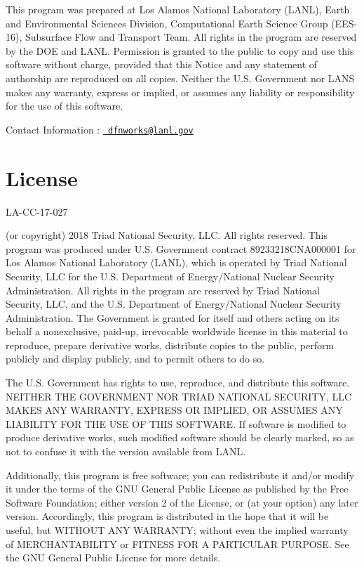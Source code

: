 This program was prepared at Los Alamos National Laboratory (L\+A\+NL), Earth and Environmental Sciences Division, Computational Earth Science Group (E\+E\+S-\/16), Subsurface Flow and Transport Team. All rights in the program are reserved by the D\+OE and L\+A\+NL. Permission is granted to the public to copy and use this software without charge, provided that this Notice and any statement of authorship are reproduced on all copies. Neither the U.\+S. Government nor L\+A\+NS makes any warranty, express or implied, or assumes any liability or responsibility for the use of this software.

Contact Information \+: \href{mailto:dfnworks@lanl.gov}{\texttt{ dfnworks@lanl.\+gov}}\hypertarget{index_license}{}\section{License}\label{index_license}
L\+A-\/\+C\+C-\/17-\/027

(or copyright) 2018 Triad National Security, L\+LC. All rights reserved. This program was produced under U.\+S. Government contract 89233218C\+N\+A000001 for Los Alamos National Laboratory (L\+A\+NL), which is operated by Triad National Security, L\+LC for the U.\+S. Department of Energy/\+National Nuclear Security Administration. All rights in the program are reserved by Triad National Security, L\+LC, and the U.\+S. Department of Energy/\+National Nuclear Security Administration. The Government is granted for itself and others acting on its behalf a nonexclusive, paid-\/up, irrevocable worldwide license in this material to reproduce, prepare derivative works, distribute copies to the public, perform publicly and display publicly, and to permit others to do so.

The U.\+S. Government has rights to use, reproduce, and distribute this software. N\+E\+I\+T\+H\+ER T\+HE G\+O\+V\+E\+R\+N\+M\+E\+NT N\+OR T\+R\+I\+AD N\+A\+T\+I\+O\+N\+AL S\+E\+C\+U\+R\+I\+TY, L\+LC M\+A\+K\+ES A\+NY W\+A\+R\+R\+A\+N\+TY, E\+X\+P\+R\+E\+SS OR I\+M\+P\+L\+I\+ED, OR A\+S\+S\+U\+M\+ES A\+NY L\+I\+A\+B\+I\+L\+I\+TY F\+OR T\+HE U\+SE OF T\+H\+IS S\+O\+F\+T\+W\+A\+RE. If software is modified to produce derivative works, such modified software should be clearly marked, so as not to confuse it with the version available from L\+A\+NL.

Additionally, this program is free software; you can redistribute it and/or modify it under the terms of the G\+NU General Public License as published by the Free Software Foundation; either version 2 of the License, or (at your option) any later version. Accordingly, this program is distributed in the hope that it will be useful, but W\+I\+T\+H\+O\+UT A\+NY W\+A\+R\+R\+A\+N\+TY; without even the implied warranty of M\+E\+R\+C\+H\+A\+N\+T\+A\+B\+I\+L\+I\+TY or F\+I\+T\+N\+E\+SS F\+OR A P\+A\+R\+T\+I\+C\+U\+L\+AR P\+U\+R\+P\+O\+SE. See the G\+NU General Public License for more details.

